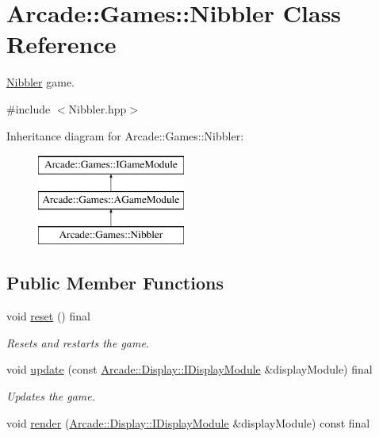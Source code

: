 \hypertarget{classArcade_1_1Games_1_1Nibbler}{}\section{Arcade\+::Games\+::Nibbler Class Reference}
\label{classArcade_1_1Games_1_1Nibbler}


\mbox{\hyperlink{classArcade_1_1Games_1_1Nibbler}{Nibbler}} game.  




{\ttfamily \#include $<$Nibbler.\+hpp$>$}

Inheritance diagram for Arcade\+::Games\+::Nibbler\+:\begin{figure}[H]
\begin{center}
\leavevmode
\includegraphics[height=3.000000cm]{classArcade_1_1Games_1_1Nibbler}
\end{center}
\end{figure}
\subsection*{Public Member Functions}
\begin{DoxyCompactItemize}
\item 
\mbox{\label{classArcade_1_1Games_1_1Nibbler_ab07050c302d764a32e42db43664e4687}} 
void \mbox{\hyperlink{classArcade_1_1Games_1_1Nibbler_ab07050c302d764a32e42db43664e4687}{reset}} () final
\begin{DoxyCompactList}\small\item\em Resets and restarts the game. \end{DoxyCompactList}\item 
void \mbox{\hyperlink{classArcade_1_1Games_1_1Nibbler_a6a44a75ab1905647587d7a6314155955}{update}} (const \mbox{\hyperlink{classArcade_1_1Display_1_1IDisplayModule}{Arcade\+::\+Display\+::\+I\+Display\+Module}} \&display\+Module) final
\begin{DoxyCompactList}\small\item\em Updates the game. \end{DoxyCompactList}\item 
void \mbox{\hyperlink{classArcade_1_1Games_1_1Nibbler_afd52ee2fad66523b58f94f9eb582145e}{render}} (\mbox{\hyperlink{classArcade_1_1Display_1_1IDisplayModule}{Arcade\+::\+Display\+::\+I\+Display\+Module}} \&display\+Module) const final
\end{DoxyCompactItemize}
